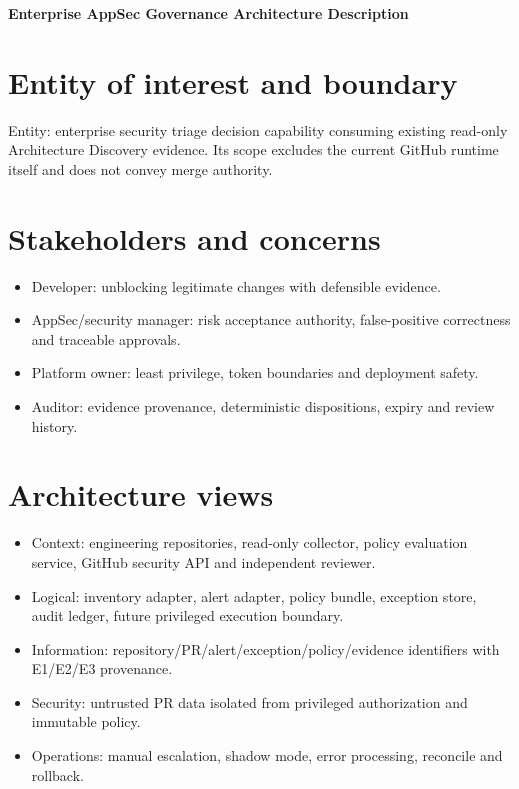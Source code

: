 \documentclass[11pt,letterpaper]{article}
\begin{document}
\begin{center}
{\LARGE\bfseries Enterprise AppSec Governance Architecture Description}\par
\vspace{5pt}{\large ISO/IEC/IEEE 42010-aligned proposed architecture}\par
\vspace{9pt}{\small Engineering reference | Proposed design | Not a deployment or approval record}\par
\end{center}
\tableofcontents
\clearpage
\section{Entity of interest and boundary}
Entity: enterprise security triage decision capability consuming existing read-only Architecture Discovery evidence. Its scope excludes the current GitHub runtime itself and does not convey merge authority.


\section{Stakeholders and concerns}
\begin{itemize}
\item Developer: unblocking legitimate changes with defensible evidence.
\item AppSec/security manager: risk acceptance authority, false-positive correctness and traceable approvals.
\item Platform owner: least privilege, token boundaries and deployment safety.
\item Auditor: evidence provenance, deterministic dispositions, expiry and review history.
\end{itemize}

\section{Architecture views}
\begin{itemize}
\item Context: engineering repositories, read-only collector, policy evaluation service, GitHub security API and independent reviewer.
\item Logical: inventory adapter, alert adapter, policy bundle, exception store, audit ledger, future privileged execution boundary.
\item Information: repository/PR/alert/exception/policy/evidence identifiers with E1/E2/E3 provenance.
\item Security: untrusted PR data isolated from privileged authorization and immutable policy.
\item Operations: manual escalation, shadow mode, error processing, reconcile and rollback.
\end{itemize}
\end{document}
